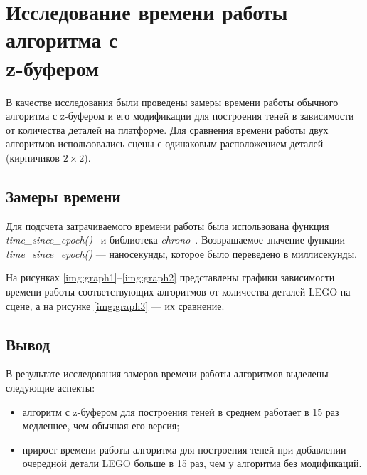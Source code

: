 \section{Исследование времени работы алгоритма с \\z-буфером}

В качестве исследования были проведены замеры времени работы обычного алгоритма с z-буфером и его модификации для построения теней в зависимости от количества деталей на платформе. Для сравнения времени работы двух алгоритмов использовались сцены с одинаковым расположением деталей (кирпичиков $2 \times 2$).

\subsection{Замеры времени}

Для подсчета затрачиваемого времени работы была использована функция \textit{time\_since\_epoch()}~\cite{time} и библиотека \textit{chrono}~\cite{chrono}. Возвращаемое значение функции \textit{time\_since\_epoch()} --- наносекунды, которое было переведено в миллисекунды.

На рисунках \ref{img:graph1}--\ref{img:graph2} представлены графики зависимости времени работы соответствующих алгоритмов от количества деталей LEGO на сцене, а на рисунке \ref{img:graph3} --- их сравнение.

\clearpage

\subsection{Вывод}

В результате исследования замеров времени работы алгоритмов выделены следующие аспекты:
\begin{itemize}[label=---]
    \item алгоритм с z-буфером для построения теней в среднем работает в 15 раз медленнее, чем обычная его версия;
    \item прирост времени работы алгоритма для построения теней при добавлении очередной детали LEGO больше в 15 раз, чем у алгоритма без модификаций.
\end{itemize}

